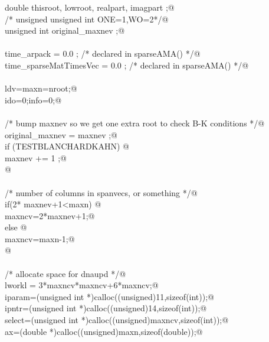 \documentclass[12pt]{article}
\begin{document}
\begin{flushleft}
\begin{minipage}{\linewidth}
\begin{list}{}{}
\mbox{}\verb@        double thisroot, lowroot, realpart, imagpart ;@\\
\mbox{}\verb@/*      unsigned unsigned int ONE=1,WO=2*/@\\
\mbox{}\verb@        unsigned int original_maxnev ;@\\
\mbox{}\verb@@\\
\mbox{}\verb@        time_arpack = 0.0 ;                             /* declared in sparseAMA() */@\\
\mbox{}\verb@        time_sparseMatTimesVec = 0.0 ;  /* declared in sparseAMA() */@\\
\mbox{}\verb@@\\
\mbox{}\verb@        ldv=maxn=nroot;@\\
\mbox{}\verb@        ido=0;info=0;@\\
\mbox{}\verb@@\\
\mbox{}\verb@        /* bump maxnev so we get one extra root to check B-K conditions */@\\
\mbox{}\verb@        original_maxnev = maxnev ;@\\
\mbox{}\verb@        if (TESTBLANCHARDKAHN) {@\\
\mbox{}\verb@                maxnev += 1 ;@\\
\mbox{}\verb@        }@\\
\mbox{}\verb@@\\
\mbox{}\verb@        /* number of columns in spanvecs, or something */@\\
\mbox{}\verb@        if(2* maxnev+1<maxn) {@\\
\mbox{}\verb@                maxncv=2*maxnev+1;@\\
\mbox{}\verb@        } else {@\\
\mbox{}\verb@                maxncv=maxn-1;@\\
\mbox{}\verb@        }@\\
\mbox{}\verb@@\\
\mbox{}\verb@        /* allocate space for dnaupd */@\\
\mbox{}\verb@        lworkl = 3*maxncv*maxncv+6*maxncv;@\\
\mbox{}\verb@        iparam=(unsigned int *)calloc((unsigned)11,sizeof(int));@\\
\mbox{}\verb@        ipntr=(unsigned int *)calloc((unsigned)14,sizeof(int));@\\
\mbox{}\verb@        select=(unsigned int *)calloc((unsigned)maxncv,sizeof(int));@\\
\mbox{}\verb@        ax=(double *)calloc((unsigned)maxn,sizeof(double));@\\

\end{list}
\end{minipage}
\end{flushleft}
\end{document}
